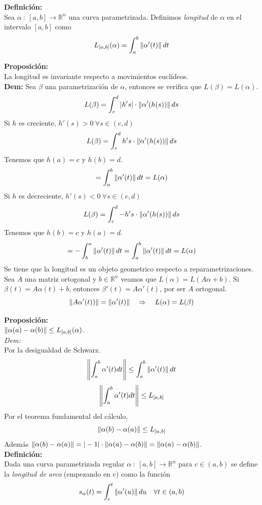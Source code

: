 \documentclass{article}
\begin{document}

\textbf{Definición:}\\
Sea $\alpha\::\:[a,b]\longrightarrow\mathbb{R}^n$ una curva parametrizada. Definimos \textit{longitud} de $\alpha$ en el intervalo $[a,b]$ como
$$
L_{[a,b]}(\alpha)=\int_a^b \left\|\alpha'(t)\right\| dt
$$


\textbf{Proposición:}\\
La longitud es invariante respecto a movimientos euclídeos.\\
\textbf{Dem:}
Sea $\beta$ una parametrización de $\alpha$, entonces se verifica que $L(\beta)=L(\alpha)$.\\
$$
L(\beta)=\int_c^d |h's|\cdot \left\|\alpha'(h(s))\right\| ds
$$
Si $h$ es creciente, $h'(s)>0 \: \forall s\in(c,d)$
$$
L(\beta)=\int_c^d h's\cdot \left\|\alpha'(h(s))\right\| ds
$$
Tenemos que $h(a)=c$ y $h(b)=d$.
$$
=\int_a^b \left\|\alpha'(t)\right\|dt=L(\alpha)
$$
Si $h$ es decreciente, $h'(s)<0 \: \forall s\in(c,d)$
$$
L(\beta)=\int_c^d -h's\cdot \left\|\alpha'(h(s))\right\| ds
$$
Tenemos que $h(b)=c$ y $h(a)=d$.
$$
=-\int_b^a \left\|\alpha'(t)\right\|dt=\int_a^b \left\|\alpha'(t)\right\|dt=L(\alpha)
$$
Se tiene que la longitud es un objeto geometrico respecto a reparametrizaciones.\\
Sea $A$ una matriz ortogonal y $b\in\mathbb{R}^n$ veamos que $L(\alpha)=L(A\alpha+b)$. Si $\beta(t)=A\alpha(t)+b$, entonces $\beta'(t)=A\alpha'(t)$, por ser $A$ ortogonal.
$$
\left\|A\alpha'(t))\right\|=\left\|\alpha'(t)\right\| \quad \Rightarrow \quad L(\alpha)=L(\beta)
$$


\textbf{Proposición:}\\
$\left\|\alpha(a)-\alpha(b)\right\|\le L_{[a,b]}(\alpha)$.\\
\textit{Dem:}\\
Por la desigualdad de Schwarz.
$$
\left\|\int_a^b \alpha'(t) dt\right\|\le \int_a^b\left\|\alpha'(t)\right\| dt
$$
$$
\left\|\int_a^b \alpha'(t) dt\right\|\le L_{[a,b]}
$$
Por el teorema fundamental del cálculo,
$$
\left\|\alpha(b)-\alpha(a)\right\|\le L_{[a,b]}
$$
Además $\left\|\alpha(b)-\alpha(a)\right\|= |-1|\cdot\left\|\alpha(a)-\alpha(b)\right\|=\left\|\alpha(a)-\alpha(b)\right\|$.\\


\textbf{Definición:}\\
Dada una curva parametrizada regular $\alpha\::\:[a,b]\longrightarrow\mathbb{R}^n$ para $c\in(a,b)$ se define la \textit{longitud de arco} (empezando en c) como la función
$$
s_\alpha(t)=\int_c^t\left\|\alpha'(u)\right\|du \quad \forall t\in(a,b)
$$
\end{document}
